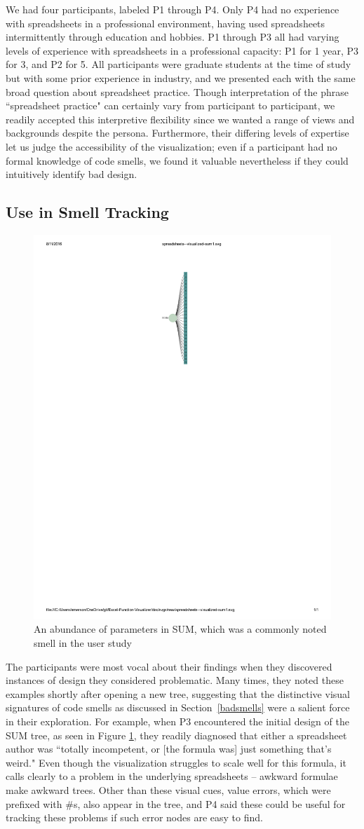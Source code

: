 \documentclass[conference]{IEEEtran}
\begin{document}
	We had four participants, labeled P1 through P4. Only P4 had no experience with
	spreadsheets in a professional environment, having used spreadsheets
	intermittently through education and hobbies. P1 through P3 all had varying
	levels of experience with spreadsheets in a professional capacity: P1 for 1
	year, P3 for 3, and P2 for 5. All participants were graduate students at the
	time of study but with some prior experience in industry, and we presented each
	with the same broad question about spreadsheet practice. Though interpretation
	of the phrase ``spreadsheet practice" can certainly vary from participant to
	participant, we readily accepted this interpretive flexibility since we wanted
	a range of views and backgrounds despite the persona. Furthermore, their
	differing levels of expertise let us judge the accessibility of the
	visualization; even if a participant had no formal knowledge of code smells, we
	found it valuable nevertheless if they could intuitively identify bad design.
	
	\subsection{Use in Smell Tracking}
	
		\begin{figure} \centering
			\includegraphics[width=.20\textwidth]{SUM}  \caption{An abundance of parameters
				in SUM, which was a commonly noted smell in the user study} \label{fig:sum}
		\end{figure}

	The participants were most vocal about their findings when they discovered
	instances of design they considered problematic. Many times, they noted these
	examples shortly after opening a new tree, suggesting that the distinctive
	visual signatures of code smells as discussed in Section~\ref{badsmells} were a salient force
	in their exploration. For example, when P3 encountered the
	initial design of the SUM tree, as seen in Figure \ref{fig:sum}, they readily
	diagnosed that either a spreadsheet author was ``totally incompetent, or [the
	formula was] just something that's weird." Even though the visualization
	struggles to scale well for this formula, it calls clearly to a problem in the
	underlying spreadsheets -- awkward formulae make awkward trees. Other than
	these visual cues, value errors, which were prefixed with \#s, also appear in the tree,
	and P4 said these could be useful for tracking these problems if such error nodes are easy to find.
	
\end{document}

